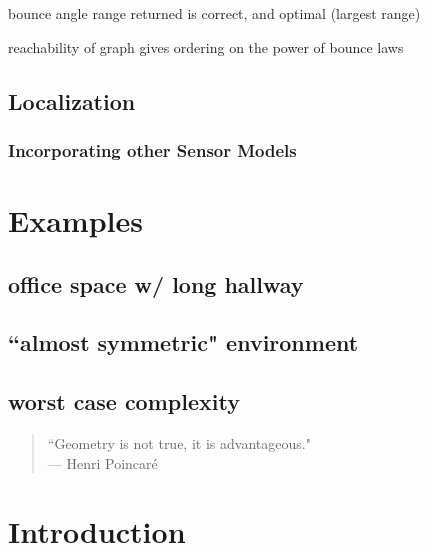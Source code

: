 \documentclass[]{styles/svproc}  %
\begin{document}
\begin{corollary} bounce angle range returned is correct, and optimal
   (largest range)
\end{corollary}

\begin{theorem}
reachability of graph gives ordering on the power of bounce laws
\end{theorem}

\subsection{Localization}

\subsubsection{Incorporating other Sensor Models}

\section{Examples}

\subsection{office space w/ long hallway}
\subsection{``almost symmetric" environment}
\subsection{worst case complexity}

\iffalse

{\small
\begin{center}
\begin{quotation}
``Geometry is not true, it is advantageous." \\
\hfill    --- Henri Poincar\'e
\end{quotation}
\end{center}
}


\section{Introduction} 
\end{document}
